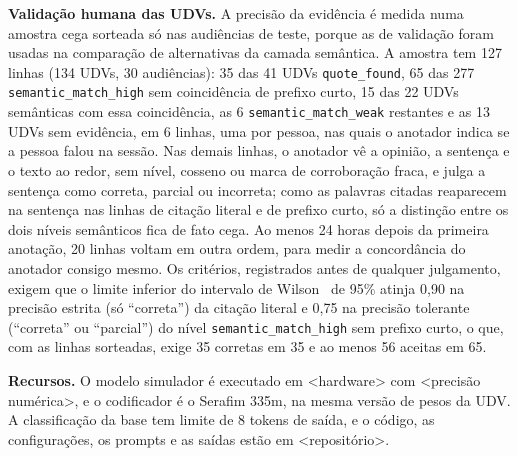 \textbf{Validação humana das UDVs.} A precisão da evidência é medida numa amostra cega sorteada só
nas audiências de teste, porque as de validação foram usadas na comparação de alternativas da camada
semântica. A amostra tem 127 linhas (134 UDVs, 30 audiências): 35 das 41 UDVs \texttt{quote\_found},
65 das 277 \texttt{semantic\_match\_high} sem coincidência de prefixo curto, 15 das 22 UDVs semânticas
com essa coincidência, as 6 \texttt{semantic\_match\_weak} restantes e as 13 UDVs sem evidência, em 6
linhas, uma por pessoa, nas quais o anotador indica se a pessoa falou na sessão. Nas demais linhas, o
anotador vê a opinião, a sentença e o texto ao redor, sem nível, cosseno ou marca de corroboração
fraca, e julga a sentença como correta, parcial ou incorreta; como as palavras citadas reaparecem na sentença nas
linhas de citação literal e de prefixo curto, só a distinção entre os dois níveis semânticos fica de
fato cega. Ao menos 24 horas depois da primeira anotação, 20 linhas voltam em outra ordem, para medir
a concordância do anotador consigo mesmo. Os critérios, registrados antes de qualquer julgamento,
exigem que o limite inferior do intervalo de Wilson~\citep{wilson1927probable} de 95\% atinja 0,90 na
precisão estrita (só ``correta'') da citação literal e 0,75 na precisão tolerante (``correta'' ou
``parcial'') do nível \texttt{semantic\_match\_high} sem prefixo curto, o que, com as linhas
sorteadas, exige 35 corretas em 35 e ao menos 56 aceitas em 65.

\textbf{Recursos.} O modelo simulador é executado em <hardware> com <precisão numérica>, e o
codificador é o Serafim 335m, na mesma versão de pesos da UDV. A classificação da base tem limite de 8
tokens de saída, e o código, as configurações, os prompts e as saídas estão em <repositório>.
